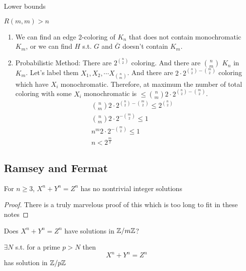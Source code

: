 
Lower bounds

\begin{proposition}
    \(R(m,m) > n\)
    \begin{enumerate}
        \item We can find an edge 2-coloring of \(K_n\) that does not contain monochromatic \(K_m\), or we can find \(H\) s.t. \(G\) and \(\bar{G}\) doesn't contain \(K_m\).
        
        \item Probabilistic Method:
        There are \(2^{{n \choose 2}}\) coloring. And there are \({n \choose m}\) \(K_n\) in \(K_m\). Let's label them \(X_1, X_2, \cdots X_{{n \choose m}} \). And there are \(2 \cdot 2^{{n \choose 2} - {m \choose 2}}\) coloring which have \(X_i\) monochromatic. Therefore, at maximum the number of total coloring with some \(X_i\) monochromatic is \(\leq {n \choose m} 2 \cdot 2^{{n \choose 2} - {m \choose 2}}\).
        \begin{eqnarray*}
            {n \choose m} 2 \cdot 2^{{n \choose 2} - {m \choose 2}} \leq 2^{{n \choose 2}} \\
            {n \choose m} 2 \cdot 2^{- {m \choose 2}} \leq 1 \\
            n^m 2 \cdot 2^{- {m \choose 2}} \leq 1 \\
            n < 2^{\frac{m}{2}}
        \end{eqnarray*} 
    \end{enumerate}
\end{proposition} 

\subsection{Ramsey and Fermat}
\begin{theorem}[Fermat]
    \label{thm:fermat}
    For \(n \geq 3\), \(X^n + Y^n = Z^n\) has no nontrivial integer solutions
\end{theorem} 
\begin{proof}
    There is a truly marvelous proof of this which is too long to fit in these notes
\end{proof}

\begin{question}
    Does \(X^n + Y^n = Z^n\) have solutions in \(\mathbb{Z} / m \mathbb{Z}\)? 
\end{question}

\begin{theorem}[Schur]
    \label{thm:schur}
    \(\exists N\) s.t. for a prime \(p > N\) then 
    \[
        X^n + Y^n = Z^n
    \] has solution in \(\mathbb{Z} / p \mathbb{Z}\) 
\end{theorem}

